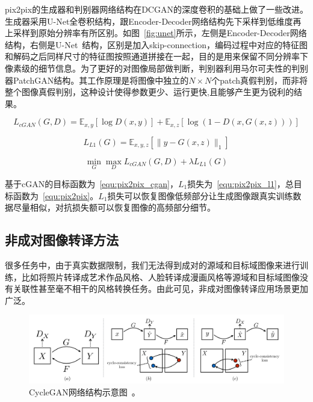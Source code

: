 pix2pix的生成器和判别器网络结构在DCGAN的深度卷积的基础上做了一些改进。生成器采用U-Net全卷积结构，跟Encoder-Decoder网络结构先下采样到低维度再上采样到原始分辨率有所区别。如图~\ref{fig:unet}所示，左侧是Encoder-Decoder网络结构，右侧是U-Net~\cite{ronneberger2015u}结构，区别是加入skip-connection，编码过程中对应的特征图和解码之后同样尺寸的特征图按照通道拼接在一起，目的是用来保留不同分辨率下像素级的细节信息。为了更好的对图像局部做判断，判别器利用马尔可夫性的判别器PatchGAN结构。其工作原理是将图像中独立的$N \times N$个patch真假判别，而非将整个图像真假判别，这种设计使得参数更少、运行更快,且能够产生更为锐利的结果。

\begin{equation}
\label{equ:pix2pix_cgan}
L_{cGAN}(G,D) = \mathbb{E}_{x,y}[\log D(x,y)] + \mathbb{E}_{x,z}[\log(1-D(x,G(x,z)))]
\end{equation}

\begin{equation}
\label{equ:pix2pix_l1}
L_{L1}(G) = \mathbb{E}_{x,y,z}[\parallel y-G(x,z) \parallel_1]
\end{equation}

\begin{equation}
\label{equ:pix2pix}
\min \limits_G \max \limits_D L_{cGAN}(G,D) + \lambda L_{L1}(G)
\end{equation}

基于cGAN的目标函数为~\ref{equ:pix2pix_cgan}，$L_1$损失为~\ref{equ:pix2pix_l1}，总目标函数为~\ref{equ:pix2pix}。$L_1$损失可以恢复图像低频部分让生成图像跟真实训练数据尽量相似，对抗损失额可以恢复图像的高频部分细节。


\subsection{非成对图像转译方法}
很多任务中，由于真实数据限制，我们无法得到成对的源域和目标域图像来进行训练，比如将照片转译成艺术作品风格、人脸转译成漫画风格等源域和目标域图像没有关联性甚至毫不相干的风格转换任务。由此可见，非成对图像转译应用场景更加广泛。

\begin{figure}[ht]
    \centering
	\includegraphics[width=\textwidth]{figures/cyclegan.pdf}
	\caption{CycleGAN网络结构示意图~\cite{zhu2017unpaired}。}
	\label{fig:cyclegan}
\end{figure}

